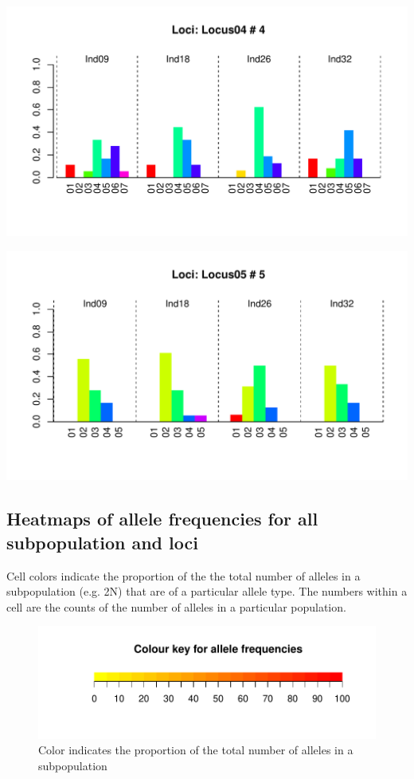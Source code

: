 \documentclass[a4paper]{scrartcl}\usepackage[]{graphicx}\usepackage[]{color}
\makeatletter
\def\maxwidth{ %
  \ifdim\Gin@nat@width>\linewidth
    \linewidth
  \else
    \Gin@nat@width
  \fi
}
\newenvironment{knitrout}{}{} %
\makeatother
\begin{document}
\begin{knitrout}
\includegraphics[width=\maxwidth]{PopGenReport-allelfreq-4} 

\includegraphics[width=\maxwidth]{PopGenReport-allelfreq-5} 

\end{knitrout}
\FloatBarrier 
\subsection{Heatmaps of allele frequencies for all subpopulation and loci}
Cell colors indicate the proportion of the the total number of alleles in a subpopulation (e.g. 2N) that are of a particular allele type. The numbers within a cell are the counts of the number of alleles in a particular population.  


\FloatBarrier
\begin{knitrout}
\color{fgcolor}\begin{figure}
\includegraphics[width=\maxwidth]{PopGenReport-keyall-1} \caption[Color indicates the proportion of the total number of alleles in a subpopulation]{Color indicates the proportion of the total number of alleles in a subpopulation}\label{fig:keyall}
\end{figure}


\end{knitrout}
\end{document}
